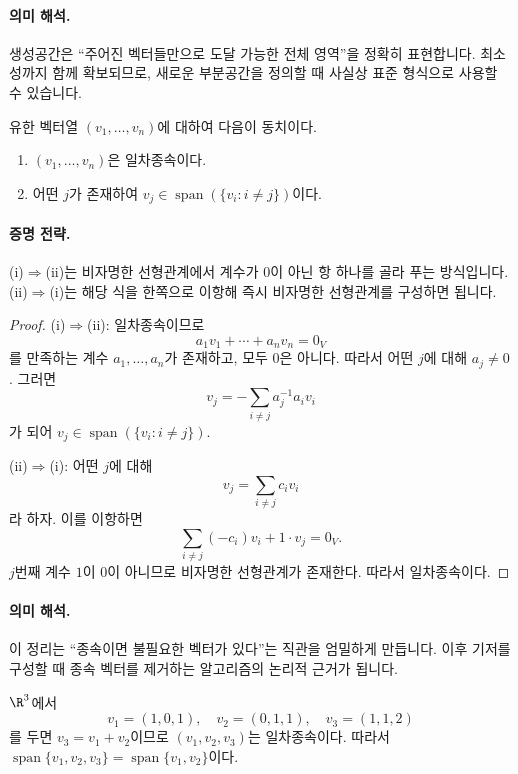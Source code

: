 \paragraph{의미 해석.}
생성공간은 ``주어진 벡터들만으로 도달 가능한 전체 영역''을 정확히 표현합니다. 최소성까지 함께 확보되므로, 새로운 부분공간을 정의할 때 사실상 표준 형식으로 사용할 수 있습니다.

\begin{theorem}
유한 벡터열 $(v_1,\dots,v_n)$에 대하여 다음이 동치이다.
\begin{enumerate}[label=(\roman*)]
\item $(v_1,\dots,v_n)$은 일차종속이다.
\item 어떤 $j$가 존재하여 $v_j\in\operatorname{span}(\{v_i:i\neq j\})$이다.
\end{enumerate}
\end{theorem}

\paragraph{증명 전략.}
(i)$\Rightarrow$(ii)는 비자명한 선형관계에서 계수가 0이 아닌 항 하나를 골라 푸는 방식입니다. (ii)$\Rightarrow$(i)는 해당 식을 한쪽으로 이항해 즉시 비자명한 선형관계를 구성하면 됩니다.

\begin{proof}
(i)$\Rightarrow$(ii): 일차종속이므로
\[
a_1v_1+\cdots+a_nv_n=0_V
\]
를 만족하는 계수 $a_1,\dots,a_n$가 존재하고, 모두 $0$은 아니다. 따라서 어떤 $j$에 대해 $a_j\neq 0$. 그러면
\[
v_j
=
-\sum_{i\neq j}a_j^{-1}a_iv_i
\]
가 되어 $v_j\in\operatorname{span}(\{v_i:i\neq j\})$.

(ii)$\Rightarrow$(i): 어떤 $j$에 대해
\[
v_j=\sum_{i\neq j}c_iv_i
\]
라 하자. 이를 이항하면
\[
\sum_{i\neq j}(-c_i)v_i+1\cdot v_j=0_V.
\]
$j$번째 계수 $1$이 0이 아니므로 비자명한 선형관계가 존재한다. 따라서 일차종속이다.
\end{proof}

\paragraph{의미 해석.}
이 정리는 ``종속이면 불필요한 벡터가 있다''는 직관을 엄밀하게 만듭니다. 이후 기저를 구성할 때 종속 벡터를 제거하는 알고리즘의 논리적 근거가 됩니다.

\begin{example}
$\R^3$에서
\[
v_1=(1,0,1),\quad v_2=(0,1,1),\quad v_3=(1,1,2)
\]
를 두면 $v_3=v_1+v_2$이므로 $(v_1,v_2,v_3)$는 일차종속이다. 따라서 $\operatorname{span}\{v_1,v_2,v_3\}=\operatorname{span}\{v_1,v_2\}$이다.
\end{example}

